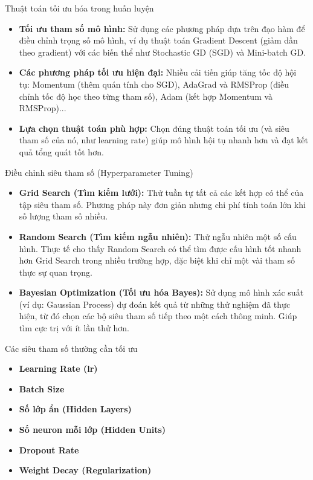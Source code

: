 \documentclass{beamer}
\begin{document}
\begin{frame}{Thuật toán tối ưu hóa trong huấn luyện}
    \begin{itemize}
        \item \textbf{Tối ưu tham số mô hình:} Sử dụng các phương pháp dựa trên đạo hàm để điều chỉnh trọng số mô hình, ví dụ thuật toán Gradient Descent (giảm dần theo gradient) với các biến thể như Stochastic GD (SGD) và Mini-batch GD.
        \item \textbf{Các phương pháp tối ưu hiện đại:} Nhiều cải tiến giúp tăng tốc độ hội tụ: Momentum (thêm quán tính cho SGD), AdaGrad và RMSProp (điều chỉnh tốc độ học theo từng tham số), Adam (kết hợp Momentum và RMSProp)...
        \item \textbf{Lựa chọn thuật toán phù hợp:} Chọn đúng thuật toán tối ưu (và siêu tham số của nó, như learning rate) giúp mô hình hội tụ nhanh hơn và đạt kết quả tổng quát tốt hơn.
    \end{itemize}
\end{frame}


\begin{frame}{Điều chỉnh siêu tham số (Hyperparameter Tuning)}
    \begin{itemize}
        \item \textbf{Grid Search (Tìm kiếm lưới):} Thử tuần tự tất cả các kết hợp có thể của tập siêu tham số. Phương pháp này đơn giản nhưng chi phí tính toán lớn khi số lượng tham số nhiều.
        \item \textbf{Random Search (Tìm kiếm ngẫu nhiên):} Thử ngẫu nhiên một số cấu hình. Thực tế cho thấy Random Search có thể tìm được cấu hình tốt nhanh hơn Grid Search trong nhiều trường hợp, đặc biệt khi chỉ một vài tham số thực sự quan trọng.
        \item \textbf{Bayesian Optimization (Tối ưu hóa Bayes):} Sử dụng mô hình xác suất (ví dụ: Gaussian Process) dự đoán kết quả từ những thử nghiệm đã thực hiện, từ đó chọn các bộ siêu tham số tiếp theo một cách thông minh. Giúp tìm cực trị với ít lần thử hơn.
    \end{itemize}
\end{frame}


\begin{frame}{Các siêu tham số thường cần tối ưu}
    \begin{itemize}
        \item \textbf{Learning Rate (lr)}
        \item \textbf{Batch Size}
        \item \textbf{Số lớp ẩn (Hidden Layers)}
        \item \textbf{Số neuron mỗi lớp (Hidden Units)}
        \item \textbf{Dropout Rate}
        \item \textbf{Weight Decay (Regularization)}
    \end{itemize}

\end{frame}
    
\end{document}
